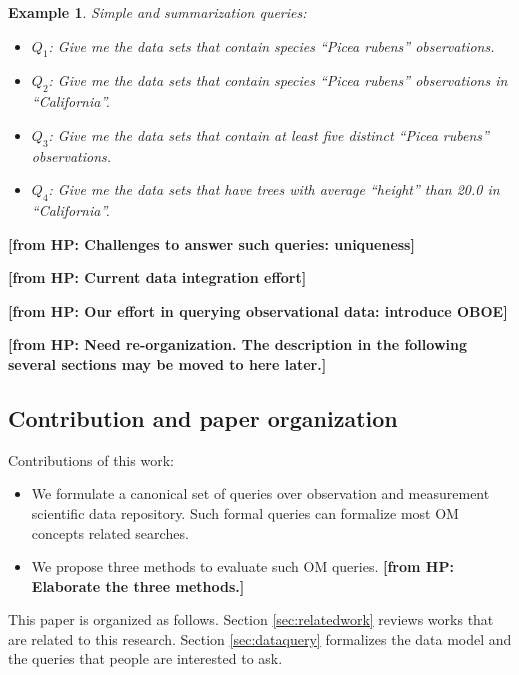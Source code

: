 \documentclass[conference]{IEEEtran}
\newtheorem{example}{Example}[section]
\newcommand{\from}[2]{{\bf[{\sc from #1:} #2]}}
\begin{document}
\begin{example}\label{eg:query}
Simple and summarization queries: 
\begin{itemize}
\item $Q_1$: Give me the data sets that contain species ``Picea rubens'' observations.
\item $Q_2$: Give me the data sets that contain species ``Picea rubens''
  observations in ``California''. 
\item $Q_3$: Give me the data sets that contain at least five distinct
  ``Picea rubens'' observations.
\item $Q_4$: Give me the data sets that have trees with average ``height''
  than 20.0 in ``California''. 
\end{itemize}
\end{example}
\from{HP}{Challenges to answer such queries: uniqueness}

\from{HP}{Current data integration effort}

\from{HP}{Our effort in querying observational data: introduce OBOE}

\from{HP}{Need re-organization. The description in the
  following several sections may be moved to here later.}

\subsection{Contribution and paper organization}
Contributions of this work:
\begin{itemize}
\item We formulate a canonical set of queries over observation and
  measurement scientific data repository. Such formal queries can
  formalize most OM concepts related searches. 
\item We propose three methods to evaluate such OM
  queries. \from{HP}{Elaborate the three methods.}
\end{itemize}

This paper is organized as follows. 
Section \ref{sec:relatedwork} reviews works that are related to this
research. Section \ref{sec:dataquery} formalizes the data model and the
queries that people are interested to ask.  
\end{document}
